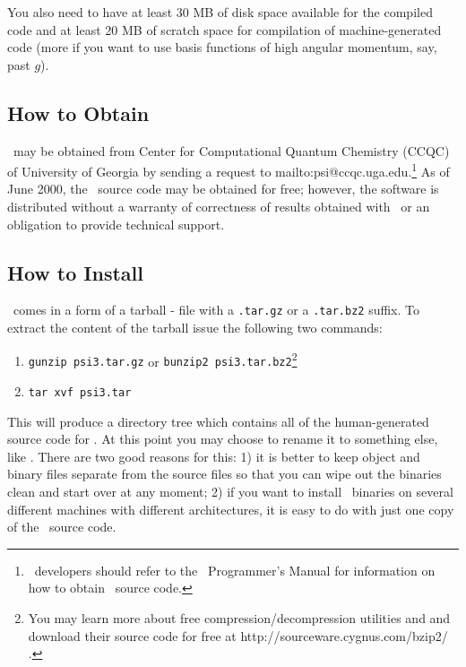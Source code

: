 You also need to have at least 30 MB of disk space available for the compiled code
and at least 20 MB of scratch space for compilation of machine-generated code (more if you
want to use basis functions of high angular momentum, say, past $g$).

\subsection{How to Obtain \PSIthree}
\PSIthree\ may be obtained from Center for Computational Quantum Chemistry (CCQC)
of University of Georgia by sending a request to 
{mailto:psi@ccqc.uga.edu}.\footnote{\PSIthree\ developers
should refer to the \PSIthree\ Programmer's Manual for information on
how to obtain \PSIthree\ source code.} As of June 2000, the \PSIthree\ source code
may be obtained for free; however, the software is distributed without
a warranty of correctness of results obtained with \PSIthree\ or
an obligation to provide technical support.

\subsection{How to Install \PSIthree}
\PSIthree\ comes in a form of a tarball - file with a {\tt .tar.gz} or
a {\tt .tar.bz2} suffix. To extract the content of the tarball
issue the following two commands:
\begin{enumerate}
\item {\tt gunzip psi3.tar.gz} or
{\tt bunzip2 psi3.tar.bz2}\footnote{You may learn more about 
free compression/decompression utilities  and
 and download their source code for 
free at 
{http://sourceware.cygnus.com/bzip2/} .}
\item {\tt tar xvf psi3.tar}
\end{enumerate}
This will produce a directory tree  which contains all
of the human-generated source code for \PSIthree. At this point
you may choose to rename it to something else, like .
There are two good reasons for this: 1) it is better to keep object and binary files
separate from the source files so that you can wipe out the binaries
clean and start over at any moment;
2) if you want to install \PSIthree\ binaries on several different machines
with different architectures, it is easy to do with just one copy of
the \PSIthree\ source code.


